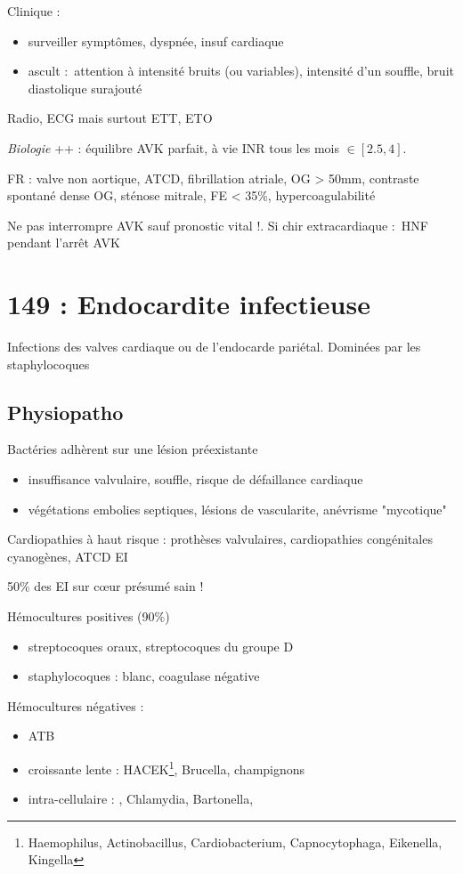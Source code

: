 \documentclass{article}
\begin{document}
Clinique : 
\begin{itemize}
  \item surveiller symptômes, dyspnée, insuf cardiaque
  \item ascult : attention à \dec intensité bruits (ou variables), \inc
    intensité d'un souffle, bruit diastolique surajouté
\end{itemize}
Radio, ECG mais surtout ETT, ETO

\textit{Biologie} ++ : équilibre AVK parfait, à vie \thus INR tous les mois $\in
[2.5, 4]$.

FR : valve non aortique, ATCD, fibrillation atriale, \diameter OG > 50mm,
contraste spontané dense OG, sténose mitrale, FE < 35\%, hypercoagulabilité

Ne pas interrompre AVK sauf pronostic vital !. Si chir extracardiaque : HNF
pendant l'arrêt AVK

\section{149 : Endocardite infectieuse}%
\label{sec:149_endocardite_infectieuse}
Infections des valves cardiaque ou de l'endocarde pariétal. Dominées par les
staphylocoques

\subsection{Physiopatho}
Bactéries adhèrent sur une lésion préexistante \thus
\begin{itemize}
  \item insuffisance valvulaire, souffle, risque de défaillance cardiaque
  \item végétations \thus embolies septiques, lésions de vascularite, anévrisme
    "mycotique"
\end{itemize}

Cardiopathies à haut risque : prothèses valvulaires, cardiopathies congénitales
cyanogènes, ATCD EI

50\% des EI sur c\oe{}ur présumé sain !

Hémocultures positives (90\%)
\begin{itemize}
  \item streptocoques oraux, streptocoques du groupe D
  \item staphylocoques : blanc, coagulase négative
\end{itemize}
Hémocultures négatives :
\begin{itemize}
   \item ATB
   \item croissante lente : HACEK\footnote{Haemophilus, Actinobacillus,
       Cardiobacterium, Capnocytophaga, Eikenella, Kingella}, Brucella, champignons
   \item intra-cellulaire : , Chlamydia, Bartonella,
\end{itemize}
\end{document}
